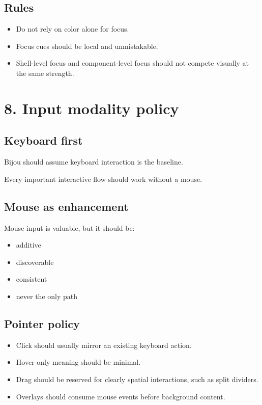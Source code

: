 \subsection{Rules}\label{record-021-rules}

\begin{itemize}
\tightlist
\item
  Do not rely on color alone for focus.
\item
  Focus cues should be local and unmistakable.
\item
  Shell-level focus and component-level focus should not compete visually at the same strength.
\end{itemize}

\section{8. Input modality policy}\label{record-021-input-modality-policy}

\subsection{Keyboard first}\label{record-021-keyboard-first}

Bijou should assume keyboard interaction is the baseline.

Every important interactive flow should work without a mouse.

\subsection{Mouse as enhancement}\label{record-021-mouse-as-enhancement}

Mouse input is valuable, but it should be:

\begin{itemize}
\tightlist
\item
  additive
\item
  discoverable
\item
  consistent
\item
  never the only path
\end{itemize}

\subsection{Pointer policy}\label{record-021-pointer-policy}

\begin{itemize}
\tightlist
\item
  Click should usually mirror an existing keyboard action.
\item
  Hover-only meaning should be minimal.
\item
  Drag should be reserved for clearly spatial interactions, such as split dividers.
\item
  Overlays should consume mouse events before background content.
\end{itemize}

